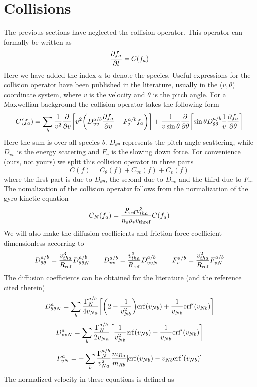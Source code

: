 \documentclass{report}
\def\be{\begin{equation}}
\def\ee{\end{equation}}
\begin{document}
\section{Collisions} 
The previous sections have neglected the collision operator. This operator can formally be written 
as 
\be 
{\partial f_a \over \partial t} = C(f_a) 
\ee 
Here we have added the index $a$ to denote the species. 
Useful expressions for the collision operator have been published in the literature, usually in the 
($v,\theta$) coordinate system, where $v$ is the velocity and $\theta$ is the pitch angle. For a 
Maxwellian background the collision operator takes the following form 
\be 
C(f_a) = \sum_b {1\over v^2} {\partial \over \partial v} \biggl [ v^2 \biggl ( 
D_{vv}^{a/b} {\partial f_a \over \partial v} - F_v^{a/b}f_a \biggr ) \biggr ] + {1 \over v 
\sin \theta } {\partial \over \partial \theta} \biggl [ \sin \theta  D_{\theta \theta}^{a/b} 
{1\over v}{\partial f_a \over \partial \theta} \biggr ] 
\ee 
Here the sum is over all species $b$. 
$D_{\theta \theta}$ represents the pitch angle scattering, while $D_{vv}$ is the energy scatering
and $F_v$ is the slowing down force. For convenience (ours, not yours) we split this collision 
operator in three parts 
\be 
C(f) = C_\theta(f) + C_{vv}(f) + C_v(f)
\ee
where the first part is due to $D_{\theta \theta}$, the second due to $D_{vv}$ and the third 
due to $F_v$. The nomalization of the collision operator follows from the normalization of the 
gyro-kinetic equation 
\be 
C_N(f_a) = {R_{\rm ref} v_{tha}^3 \over n_a \rho_* v_{\rm thref}} C(f_a)
\ee
We will also make the diffusion coefficients and friction force coefficient dimensionless accorring 
to 
\be 
D_{\theta \theta}^{a/b} = {v_{tha}^3 \over R_{\rm ref}} D_{\theta \theta N}^{a/b} \qquad 
D_{vv}^{a/b} = {v_{tha}^3 \over R_{\rm ref}} D_{vv N}^{a/b} \qquad 
F_v^{a/b} =  {v_{tha}^2 \over R_{\rm ref}} F_{v N}^{a/b}  
\ee
The diffusion coefficients can be obtained for the literature \cite{KAR86} (and the reference cited therein) 
\be 
D_{\theta \theta N}^{a} = \sum_b {\Gamma^{a/b}_N \over 4 v_{Na}} \biggl [ \biggl ( 2 - {1\over v_{Nb}^2} \biggr ) 
{\rm erf}(v_{Nb}) + {1 \over v_{Nb}} {\rm erf}^\prime (v_{Nb}) \biggr ] 
\ee
\be 
D_{vvN}^{a} = \sum_b { \Gamma^{a/b}_N  \over 2 v_{Na}} \biggl [ {1 \over v_{Nb}^2} {\rm erf}(v_{Nb}) - 
{1\over v_{Nb}}{\rm erf}^\prime (v_{Nb}) \biggr ] 
\ee 
\be 
F_{vN}^{a} = - \sum_b {\Gamma^{a/b}_N \over v_{Na}^2} {m_{Ra} \over m_{Rb}} [ {\rm erf}(v_{Nb}) - v_{Nb} {\rm erf}^\prime (v_{Nb})  ]  
\ee 
The normalized velocity in these equations is defined as 
\end{document}
